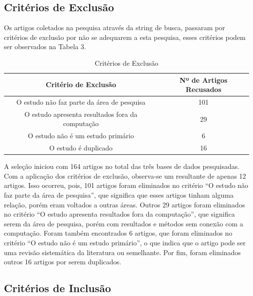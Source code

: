 \subsection{Critérios de Exclusão}

Os artigos coletados na pesquisa através da string de busca, passaram por critérios de exclusão por não se adequarem a esta pesquisa, esses critérios podem ser observados na Tabela 3. 

\begin{table}[!htb]
	\centering
	\caption{Critérios de Exclusão}
	\label{tbl:exclusao}
	\begin{tabular}{|c|c|}
		\hline
		\textbf{Critério de Exclusão}                    & \textbf{Nº de Artigos Recusados} \\ \hline
		O estudo não faz parte da área de pesquisa       & 101                               \\ \hline
		O estudo apresenta resultados fora da computação & 29                                \\ \hline
		O estudo não é um estudo primário               & 6                                 \\ \hline
		O estudo é duplicado                              & 16                                \\ \hline
	\end{tabular}
	\vspace{6pt}
\end{table}

A seleção iniciou com 164 artigos no total das três bases de dados pesquisadas. Com a aplicação dos critérios de exclusão, observa-se um resultante de apenas 12 artigos. Isso ocorreu, pois, 101 artigos foram eliminados no critério ``O estudo não faz parte da área de pesquisa'', que significa que esses artigos tinham alguma relação, porém eram voltados a outras áreas. Outros 29 artigos foram eliminados no critério ``O estudo apresenta resultados fora da computação'', que significa serem da área de pesquisa, porém com resultados e métodos sem conexão com a computação. Foram também encontrados 6 artigos, que foram eliminados no critério ``O estudo não é um estudo primário'', o que indica que o artigo pode ser uma revisão sistemática da literatura ou semelhante. Por fim, foram eliminados outros 16 artigos por serem duplicados.

\subsection{Critérios de Inclusão}


